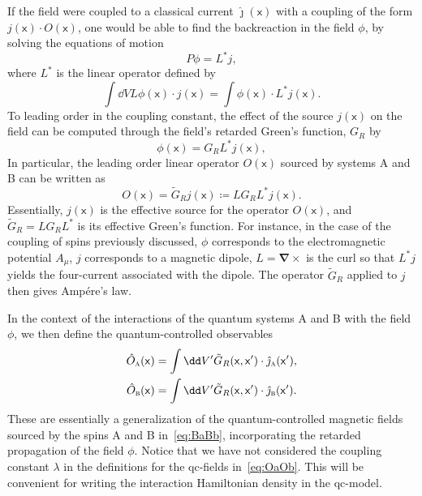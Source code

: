 \documentclass[letterpaper,12pt,titlepage,oneside,final]{book}
\newcommand{\mf}{\mathsf}%
\newcommand{\tc}[1]{\textsc{#1}}
\begin{document}
If the field were coupled to a classical current $\hat{\jmath}(\mf x)$ with a coupling of the form $j(\mf x)\cdot O(\mf x)$, one would be able to find the backreaction in the field $\phi$, by solving the equations of motion
\begin{equation}
    P\phi = L^* j,
\end{equation}
where $L^*$ is the linear operator defined by
\begin{equation}
    \int \dd V L\phi(\mf x) \cdot j(\mf x) = \int \phi(\mf x) \cdot L^*j(\mf x).
\end{equation}
To leading order in the coupling constant, the effect of the source $j(\mf x)$ on the field can be computed through the field's retarded Green's function, $G_R$ by
\begin{equation}
    \phi(\mf x) = G_R L^* j(\mf x),
\end{equation}
In particular, the leading order linear operator $O(\mf x)$ sourced by systems A and B can be written as
\begin{equation}
    O(\mf x) =  \tilde{G}_Rj(\mf x)\coloneqq L G_RL^*j(\mf x).
\end{equation}
Essentially, $j(\mf x)$ is the effective source for the operator $O(\mf x)$, and $\tilde{G}_R = LG_RL^*$ is its effective Green's function. For instance, in the case of the coupling of spins previously discussed, $\phi$ corresponds to the electromagnetic potential $A_\mu$, $j$ corresponds to a magnetic dipole, $L = \bm\nabla\times$ is the curl so that $L^*j$ yields the four-current associated with the dipole. The operator $\tilde{G}_R$ applied to $j$ then gives Amp\'ere's law.

In the context of the interactions of the quantum systems A and B with the field $\phi$, we then define the quantum-controlled observables
\begin{align}
    \hat{O}_\tc{a}(\mf x) &= \int \dd V' \tilde{G}_R(\mf x,\mf x') \cdot \hat{\jmath}_\tc{a}(\mf x'),\label{eq:OaOb}\\
    \hat{O}_\tc{b}(\mf x) &= \int \dd V' \tilde{G}_R(\mf x, \mf x') \cdot \hat{\jmath}_\tc{b}(\mf x').\nonumber
\end{align}
These are essentially a generalization of the quantum-controlled magnetic fields sourced by the spins A and B in~\eqref{eq:BaBb}, incorporating the retarded propagation of the field $\phi$. Notice that we have not considered the coupling constant $\lambda$ in the definitions for the qc-fields in~\eqref{eq:OaOb}. This will be convenient for writing the interaction Hamiltonian density in the qc-model.
\end{document}
